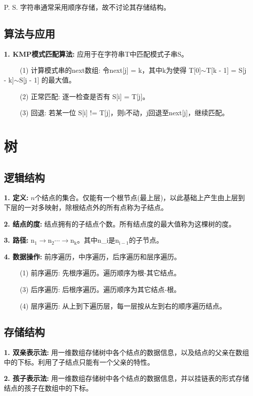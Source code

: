 P. S. 字符串通常采用顺序存储，故不讨论其存储结构。

\subsection{算法与应用}

\textbf{1. KMP模式匹配算法: }应用于在字符串T中匹配模式子串S。

~~~~ (1) 计算模式串的next数组: 令next[j] = k，其中k为使得 T[0]$\sim$T[k - 1] = S[j - k]$\sim$S[j - 1] 的最大值。

~~~~ (2) 正常匹配: 逐一检查是否有 S[i] = T[j]。

~~~~ (3) 回退: 若某一位 S[i] != T[j]，则i不动，j回退至next[j]，继续匹配。

\section{树}

\subsection{逻辑结构}

\textbf{1. 定义: }$n$个结点的集合。仅能有一个根节点(最上层)，以此基础上产生由上层到下层的一对多映射，除根结点外的所有点称为子结点。

\textbf{2. 结点的度: }结点拥有的子结点个数。所有结点度的最大值称为这棵树的度。

\textbf{3. 路径: }n$_1\rightarrow$n$_2\cdots \rightarrow$n$_\text{k}$。其中n\_i是n$_{\text{i}-1}$的子节点。

\textbf{4. 数据操作: }前序遍历，中序遍历，后序遍历和层序遍历。

~~~~ (1) 前序遍历: 先根序遍历。遍历顺序为根-其它结点。

~~~~ (3) 后序遍历: 后根序遍历。遍历顺序为其它结点-根。

~~~~ (4) 层序遍历: 从上到下遍历层，每一层按从左到右的顺序遍历结点。

\subsection{存储结构}

\textbf{1. 双亲表示法: }用一维数组存储树中各个结点的数据信息，以及结点的父亲在数组中的下标。利用了子结点只能有一个父亲的特性。

\textbf{2. 孩子表示法: }用一维数组存储树中各个结点的数据信息，并以挂链表的形式存储结点的孩子在数组中的下标。


